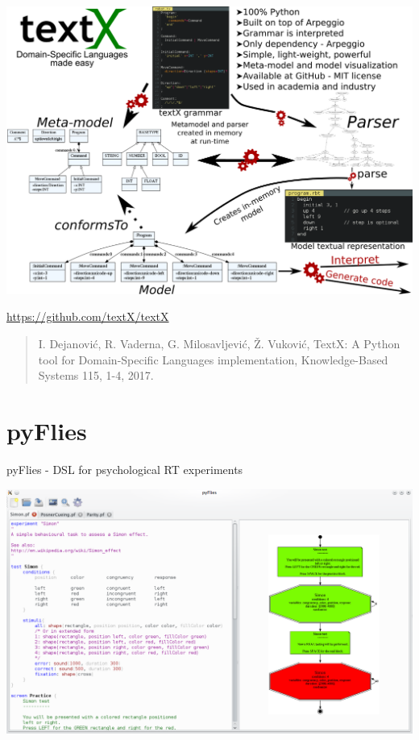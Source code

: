 \documentclass[presentation]{beamer}
\begin{document}
\begin{frame}[label={sec:orgc2a46d5}]{}
\vfill
\begin{center}
\includegraphics[width=.9\linewidth]{./images/textX.png}
\end{center} 
\begin{center}
\fontsize{9pt}\selectfont
\url{https://github.com/textX/textX}
\end{center}
\fontsize{6pt}\selectfont
\begin{quote}
I. Dejanović, R. Vaderna, G. Milosavljević, Ž. Vuković, TextX: A Python tool for
Domain-Specific Languages implementation, Knowledge-Based Systems 115,
1-4, 2017.
\end{quote}
\end{frame}
\section*{pyFlies}
\label{sec:org22737d2}
\begin{frame}[label={sec:org491ceba}]{pyFlies - DSL for psychological RT experiments}
\begin{center}
\includegraphics[width=1\textwidth]{./images/pyFliesGUI.png}
\end{center}
\end{frame}
\end{document}

